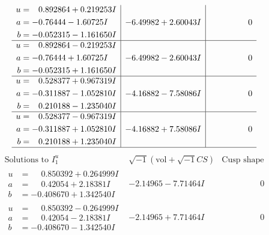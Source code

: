 \documentclass[1p]{elsarticle_modified}
\theoremstyle{definition}
\newcommand{\I}{\sqrt{-1}}
\begin{document}
$$\begin{array}{c|c|c}
\begin{aligned}
u &= \phantom{-}0.892864 + 0.219253 I \\
a &= -0.76444 - 1.60725 I \\
b &= -0.052315 - 1.161650 I\end{aligned}
 & -6.49982 + 2.60043 I & \phantom{-0.000000 } 0 \\ \hline\begin{aligned}
u &= \phantom{-}0.892864 - 0.219253 I \\
a &= -0.76444 + 1.60725 I \\
b &= -0.052315 + 1.161650 I\end{aligned}
 & -6.49982 - 2.60043 I & \phantom{-0.000000 } 0 \\ \hline\begin{aligned}
u &= \phantom{-}0.528377 + 0.967319 I \\
a &= -0.311887 - 1.052810 I \\
b &= \phantom{-}0.210188 - 1.235040 I\end{aligned}
 & -4.16882 - 7.58086 I & \phantom{-0.000000 } 0 \\ \hline\begin{aligned}
u &= \phantom{-}0.528377 - 0.967319 I \\
a &= -0.311887 + 1.052810 I \\
b &= \phantom{-}0.210188 + 1.235040 I\end{aligned}
 & -4.16882 + 7.58086 I & \phantom{-0.000000 } 0\\
 \hline 
 \end{array}$$\newpage$$\begin{array}{c|c|c}  
\text{Solutions to }I^u_{1}& \I (\text{vol} + \sqrt{-1}CS) & \text{Cusp shape}\\
 \hline 
\begin{aligned}
u &= \phantom{-}0.850392 + 0.264999 I \\
a &= \phantom{-}0.42054 + 2.18381 I \\
b &= -0.408670 + 1.342540 I\end{aligned}
 & -2.14965 - 7.71464 I & \phantom{-0.000000 } 0 \\ \hline\begin{aligned}
u &= \phantom{-}0.850392 - 0.264999 I \\
a &= \phantom{-}0.42054 - 2.18381 I \\
b &= -0.408670 - 1.342540 I\end{aligned}
 & -2.14965 + 7.71464 I & \phantom{-0.000000 } 0 \\ \hline\begin{aligned}

\end{aligned}
\end{array}$$
\end{document}
